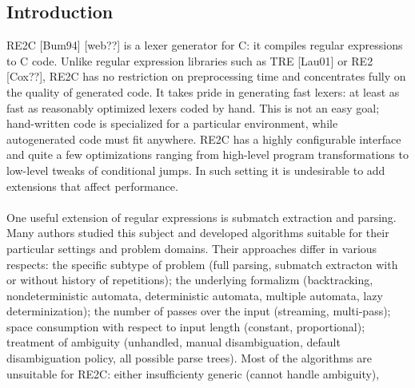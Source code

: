 \documentclass{article}
\theoremstyle{definition}
\begin{document}
\begin{multicols}{2}

\section*{Introduction}

RE2C [Bum94] [web??] is a lexer generator for C: it compiles regular expressions to C code.
Unlike regular expression libraries such as TRE [Lau01] or RE2 [Cox??], RE2C has no restriction on preprocessing time
and concentrates fully on the quality of generated code.
It takes pride in generating fast lexers: at least as fast as reasonably optimized lexers coded by hand.
This is not an easy goal; hand-written code is specialized for a particular environment, while autogenerated code must fit anywhere.
RE2C has a highly configurable interface and quite a few optimizations ranging from
high-level program transformations to low-level tweaks of conditional jumps.
In such setting it is undesirable to add extensions that affect performance.
\\ \\
One useful extension of regular expressions is submatch extraction and parsing.
Many authors studied this subject and developed algorithms suitable for their particular settings and problem domains.
Their approaches differ in various respects:
the specific subtype of problem (full parsing, submatch extracton with or without history of repetitions);
the underlying formalizm (backtracking,
nondeterministic automata, deterministic automata, 
multiple automata, lazy determinization);
the number of passes over the input (streaming, multi-pass);
space consumption with respect to input length (constant, proportional);
treatment of ambiguity (unhandled, manual disambiguation, default disambiguation policy, all possible parse trees).
Most of the algorithms are unsuitable for RE2C: either insufficienty generic (cannot handle ambiguity),

\end{multicols}
\end{document}

